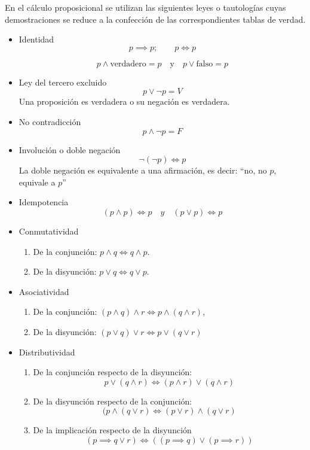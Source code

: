 En el cálculo proposicional se utilizan las siguientes leyes o tautologías cuyas demostraciones se reduce a la confección de las correspondientes tablas de verdad.

\begin{itemize}
	\item Identidad
	\[ p \implies p; \qquad p \iff p \]
	
	\[ p \land \mbox{verdadero} = p \quad \mbox{y} \quad p \lor \mbox{falso} = p \]
	
	\item Ley del tercero excluido
	\[ p \lor \neg p = V\]
	Una proposición es verdadera o su negación es verdadera.
	
	\item No contradicción
	\[ p \land \neg p = F \]
	
	\item Involución o doble negación
	\[ \neg (\neg p) \iff p \]
	La doble negación es equivalente a una afirmación, es decir: ``no, no $p$, equivale a $p$''
	\item Idempotencia
	\[ (p \land p) \iff p \quad y \quad (p \lor p) \iff p\]
	\item Conmutatividad
	\begin{enumerate}[label=\alph*)]
		\item De la conjunción: $p \land q \iff q \land p$. 		
		\item De la disyunción: $p \lor q \iff q \lor p$.
	\end{enumerate}
	\item Asociatividad
	\begin{enumerate}[label=\alph*)]
		\item De la conjunción: $(p \land q) \land r \iff p \land (q \land r)$,
		
		\item De la disyunción: $(p \lor q) \lor r \iff p \lor (q \lor r)$
	\end{enumerate}
	\item Distributividad
	\begin{enumerate}[label=\alph*)]
		\item De la conjunción respecto de la disyunción:
		\[ p \lor (q \land r) \iff (p \land r) \lor (q \land r) \]
		
		\item De la disyunción respecto de la conjunción:
		\[(p \land (q \lor r) \iff (p \lor r) \land (q \lor r) \]
		
		\item De la implicación respecto de la disyunción
		\[ \left( p \implies q \lor r \right) \iff \left( (p \implies q) \lor (p \implies r) \right) \]


\end{enumerate}
\end{itemize}
